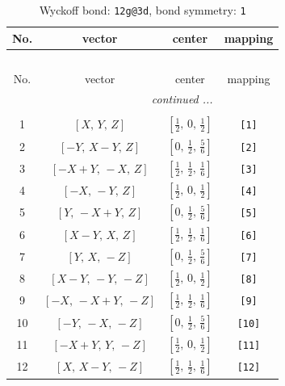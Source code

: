 \documentclass[fleqn,8pt]{jsarticle}
\begin{document}
\begin{longtable}{cccc}
\caption{Wyckoff bond: {\tt 12g@3d}, bond symmetry: {\tt 1}}
 \\
 \hline \hline
No. & vector & center & mapping \\ \hline \endfirsthead

\multicolumn{3}{l}{\tablename\ \thetable{}} \\
 \hline \hline
No. & vector & center & mapping \\ \hline \endhead

 \hline \hline
\multicolumn{3}{r}{\footnotesize\it continued ...} \\ \endfoot

 \hline \hline
\multicolumn{3}{r}{} \\ \endlastfoot

1 & $\left[ X,\, Y,\, Z \right]$ & $\left[ \frac{1}{2},\, 0,\, \frac{1}{2} \right]$ & {\tt [1]} \\ \hline
2 & $\left[ - Y,\, X - Y,\, Z \right]$ & $\left[ 0,\, \frac{1}{2},\, \frac{5}{6} \right]$ & {\tt [2]} \\ \hline
3 & $\left[ - X + Y,\, - X,\, Z \right]$ & $\left[ \frac{1}{2},\, \frac{1}{2},\, \frac{1}{6} \right]$ & {\tt [3]} \\ \hline
4 & $\left[ - X,\, - Y,\, Z \right]$ & $\left[ \frac{1}{2},\, 0,\, \frac{1}{2} \right]$ & {\tt [4]} \\ \hline
5 & $\left[ Y,\, - X + Y,\, Z \right]$ & $\left[ 0,\, \frac{1}{2},\, \frac{5}{6} \right]$ & {\tt [5]} \\ \hline
6 & $\left[ X - Y,\, X,\, Z \right]$ & $\left[ \frac{1}{2},\, \frac{1}{2},\, \frac{1}{6} \right]$ & {\tt [6]} \\ \hline
7 & $\left[ Y,\, X,\, - Z \right]$ & $\left[ 0,\, \frac{1}{2},\, \frac{5}{6} \right]$ & {\tt [7]} \\ \hline
8 & $\left[ X - Y,\, - Y,\, - Z \right]$ & $\left[ \frac{1}{2},\, 0,\, \frac{1}{2} \right]$ & {\tt [8]} \\ \hline
9 & $\left[ - X,\, - X + Y,\, - Z \right]$ & $\left[ \frac{1}{2},\, \frac{1}{2},\, \frac{1}{6} \right]$ & {\tt [9]} \\ \hline
10 & $\left[ - Y,\, - X,\, - Z \right]$ & $\left[ 0,\, \frac{1}{2},\, \frac{5}{6} \right]$ & {\tt [10]} \\ \hline
11 & $\left[ - X + Y,\, Y,\, - Z \right]$ & $\left[ \frac{1}{2},\, 0,\, \frac{1}{2} \right]$ & {\tt [11]} \\ \hline
12 & $\left[ X,\, X - Y,\, - Z \right]$ & $\left[ \frac{1}{2},\, \frac{1}{2},\, \frac{1}{6} \right]$ & {\tt [12]} \\
\end{longtable}
\end{document}

